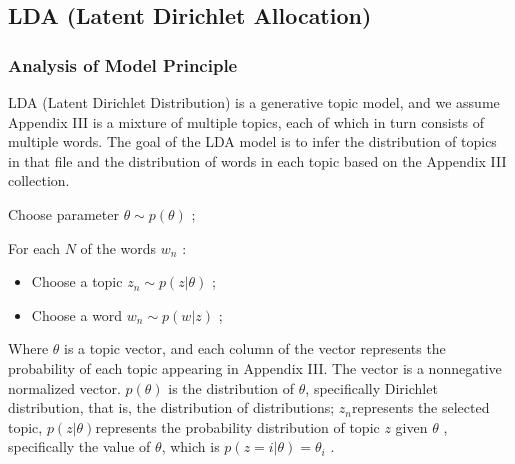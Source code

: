\documentclass[12pt]{mcmthesis}
\begin{document}
\subsection{LDA (Latent Dirichlet Allocation)}
\label{sec5.3}
\subsubsection{Analysis of Model Principle}
LDA (Latent Dirichlet Distribution) is a generative topic model, and we assume Appendix III is a mixture of multiple topics, each of which in turn consists of multiple words. The goal of the LDA model is to infer the distribution of topics in that file and the distribution of words in each topic based on the Appendix III collection.

Choose parameter $\theta\sim p(\theta)$ ;

For each  $N$ of the  words $w_n$ :
\begin{itemize}
\item Choose a topic $z_n\sim p(z|\theta)$ ;
\item Choose a word $w_n\sim p(w|z)$ ;
\end{itemize}

Where $\theta$ is a topic vector, and each column of the vector represents the probability of each topic appearing in Appendix III. The vector is a nonnegative normalized vector. $p(\theta)$ is the distribution of $\theta$, specifically Dirichlet distribution, that is, the distribution of distributions;  $z_n$represents the selected topic,  $p(z|\theta)$represents the probability distribution of topic  $z$ given $\theta$ , specifically the value of $\theta$, which is $p(z=i|\theta)=\theta_{i}$ .
\end{document}
